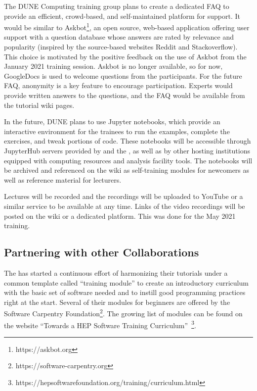 \documentclass[../main-v1.tex]{subfiles}
\begin{document}
The DUNE Computing training group plans to create a dedicated FAQ to provide an efficient, crowd-based, and self-maintained platform for support. It would be similar to Askbot\footnote{https://askbot.org}, an open source, web-based application offering user support with a question database whose answers are rated by relevance and popularity (inspired by the source-based websites Reddit and Stackoverflow). This choice is motivated by the positive feedback on the use of Askbot from the January 2021 training session.  Askbot is no longer available, so for now, GoogleDocs is used %
to welcome questions from the participants. For the future FAQ, anonymity is a key feature to encourage participation. %
Experts %
would provide written answers to the questions, and the FAQ would be available from %
the tutorial wiki pages. %

In the future, DUNE %
plans to use Jupyter notebooks, %
which provide an interactive environment for the trainees to run the examples, complete the exercises, and tweak portions of code. %
These notebooks will be accessible through %
JupyterHub servers provided by  and the , as well as by other hosting institutions equipped with computing resources and analysis facility tools. The notebooks will be archived and referenced on the wiki as self-training modules for newcomers as well as %
reference material for %
lecturers.

Lectures will be recorded and the recordings will be uploaded to YouTube or a similar service to be available at any time.  Links of the video recordings will be posted on the wiki or a dedicated platform. %
This %
was done for the May 2021 training.

\subsection{Partnering with other Collaborations}
The  has started a continuous effort of harmonizing their tutorials under a common template called ``training module'' %
to create an introductory curriculum %
with the basic set of software needed %
and to instill good programming practices right at the start. Several of their modules for beginners are offered by the Software Carpentry Foundation\footnote{https://software-carpentry.org}. The growing list of modules can be found on the  website ``Towards a HEP Software Training Curriculum''~\footnote{https://hepsoftwarefoundation.org/training/curriculum.html}.
\end{document}

